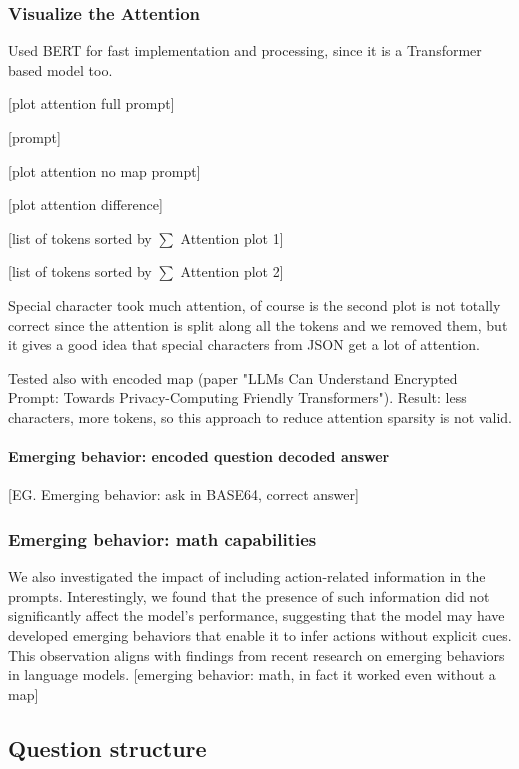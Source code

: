 \subsubsection{Visualize the Attention}
\label{sec:visualize_the_attention}

Used BERT for fast implementation and processing, since it is a Transformer
based model too.

[plot attention full prompt]

[prompt]

[plot attention no map prompt]

[plot attention difference]

[list of tokens sorted by $\sum$ Attention plot 1]

[list of tokens sorted by $\sum$ Attention plot 2]

Special character took much attention, of course is the second plot is not totally
correct since the attention is split along all the tokens and we removed them,
but it gives a good idea that special characters from JSON get a lot of
attention.

Tested also with encoded map (paper "LLMs Can Understand Encrypted Prompt: Towards
Privacy-Computing Friendly Transformers"). Result: less characters, more tokens,
so this approach to reduce attention sparsity is not valid.
\paragraph{Emerging behavior: encoded question decoded answer}
[EG. Emerging behavior: ask in BASE64, correct answer]

\subsubsection{Emerging behavior: math capabilities}

We also investigated the impact of including action-related information in the
prompts. Interestingly, we found that the presence of such information did not
significantly affect the model's performance, suggesting that the model may have
developed emerging behaviors that enable it to infer actions without explicit cues.
This observation aligns with findings from recent research on emerging behaviors
in language models. [emerging behavior: math, in fact it worked even without a
map]

\subsection{Question structure}


